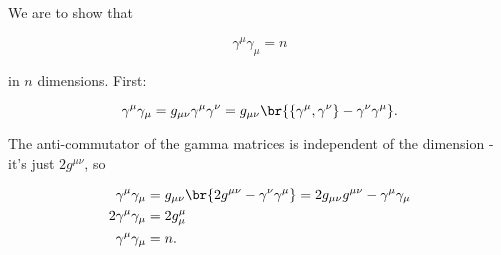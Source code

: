 \section{}

We are to show that 

\begin{equation}
    \gamma^{\mu}\gamma_{\mu} = n
\end{equation}

in $n$ dimensions. First:

\begin{equation*}
    \gamma^{\mu}\gamma_{\mu} = g_{\mu\nu}\gamma^{\mu}\gamma^{\nu} = g_{\mu\nu}\br{\{\gamma^{\mu}, \gamma^{\nu}\} - \gamma^{\nu}\gamma^{\mu}}.
\end{equation*}

The anti-commutator of the gamma matrices is independent of the dimension - it's just $2g^{\mu\nu}$, so

\begin{align*}
    \gamma^{\mu}\gamma_{\mu} &= g_{\mu\nu}\br{2g^{\mu\nu} - \gamma^{\nu}\gamma^{\mu}} = 2g_{\mu\nu}g^{\mu\nu} - \gamma^{\mu}\gamma_{\mu} \\
    2\gamma^{\mu}\gamma_{\mu} &= 2g_{\mu}^{\mu} \\
    \gamma^{\mu}\gamma_{\mu} &= n.
\end{align*}
